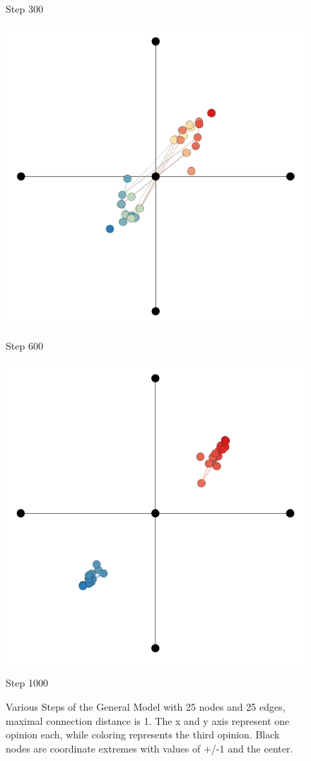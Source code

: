 \documentclass[11pt]{article}
\begin{document}
\begin{figure}[h!]
  \caption*{Step 300}
\endminipage\hfill
{}
  \includegraphics[width=\linewidth]{images/Evolutions/WBG25_600.png}
  \caption*{Step 600}
\endminipage\hfill
{}
  \includegraphics[width=\linewidth]{images/Evolutions/WBG25_1000.png}
  \caption*{Step 1000}
\endminipage\hfill
\caption{Various Steps of the General Model with 25 nodes and 25 edges, maximal connection distance is 1. The x and y axis represent one opinion each, while coloring represents the third opinion. Black nodes are coordinate extremes with values of +/-1 and the center.}
\label{dynamic graph}
\end{figure}
\end{document}
